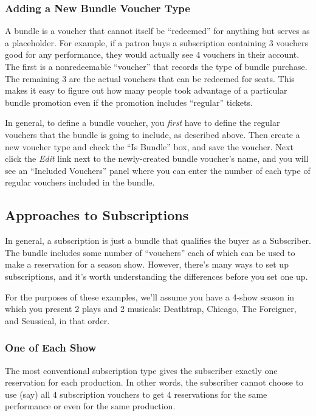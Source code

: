 \subsubsection{Adding a New Bundle Voucher Type}
\label{sec:addingbundlevouchertypes}


A bundle is a voucher that cannot itself be ``redeemed'' for anything
but serves as a placeholder.  For example, if a patron buys a
subscription containing 3 vouchers good for any performance, they would
actually see 4 vouchers in their account.  The first is a nonredeemable
``voucher'' that records the type of bundle purchase.  The remaining 3
are the actual vouchers that can be redeemed for seats.  This makes it
easy to figure out how many people took advantage of a particular
bundle promotion even if the promotion includes ``regular'' tickets.

In general, to define a bundle voucher, you \emph{first} have to define the
regular vouchers that the bundle is going to include, as described
above.   Then create a new voucher type and check the ``Is Bundle'' box,
and save the voucher.  Next click the \emph{Edit} link next to the
newly-created bundle voucher's name, and you will see an ``Included
Vouchers''  panel where you can enter the
number of each type of regular vouchers included in the bundle.

\subsection{Approaches to Subscriptions}
\label{sec:subscriptions}

In general, a subscription is just a bundle that qualifies the buyer as
a Subscriber.  The bundle includes some number of ``vouchers'' each of
which can be used to make a reservation for a season show.  However,
there's many ways to set up subscriptions, and it's worth understanding
the differences before you set one up.

For the purposes of these examples, we'll assume you have a 4-show
season in which you present 2 plays and 2 musicals: Deathtrap, Chicago,
The Foreigner, and Seussical, in that order.

\subsubsection{One of Each Show}

The most conventional subscription type gives the subscriber exactly one
reservation for each production.  In other words, the subscriber cannot
choose to use (say) all 4 subscription vouchers to get 4 reservations
for the same performance or even for the same production.

